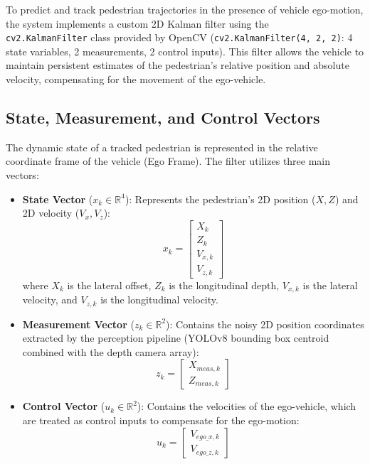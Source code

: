 To predict and track pedestrian trajectories in the presence of vehicle ego-motion, the system implements a custom 2D Kalman filter using the  \\
\texttt{cv2.KalmanFilter} class provided by OpenCV (\texttt{cv2.KalmanFilter(4, 2, 2)}: 4 state variables, 2 measurements, 2 control inputs). This filter allows the vehicle to maintain persistent estimates of the pedestrian's relative position and absolute velocity, compensating for the movement of the ego-vehicle.

\subsection{State, Measurement, and Control Vectors}

The dynamic state of a tracked pedestrian is represented in the relative coordinate frame of the vehicle (Ego Frame). The filter utilizes three main vectors:

\begin{itemize}
    \item \textbf{State Vector} ($x_k \in \mathbb{R}^4$): Represents the pedestrian's 2D position ($X, Z$) and 2D velocity ($V_x, V_z$):
    \begin{equation}
        x_k = \begin{bmatrix} X_k \\ Z_k \\ V_{x,k} \\ V_{z,k} \end{bmatrix}
    \end{equation}
    where $X_k$ is the lateral offset, $Z_k$ is the longitudinal depth, $V_{x,k}$ is the lateral velocity, and $V_{z,k}$ is the longitudinal velocity.

    \item \textbf{Measurement Vector} ($z_k \in \mathbb{R}^2$): Contains the noisy 2D position coordinates extracted by the perception pipeline (YOLOv8 bounding box centroid combined with the depth camera array):
    \begin{equation}
        z_k = \begin{bmatrix} X_{meas, k} \\ Z_{meas, k} \end{bmatrix}
    \end{equation}

    \item \textbf{Control Vector} ($u_k \in \mathbb{R}^2$): Contains the velocities of the ego-vehicle, which are treated as control inputs to compensate for the ego-motion:
    \begin{equation}
        u_k = \begin{bmatrix} V_{ego\_x, k} \\ V_{ego\_z, k} \end{bmatrix}
    \end{equation}
\end{itemize}

